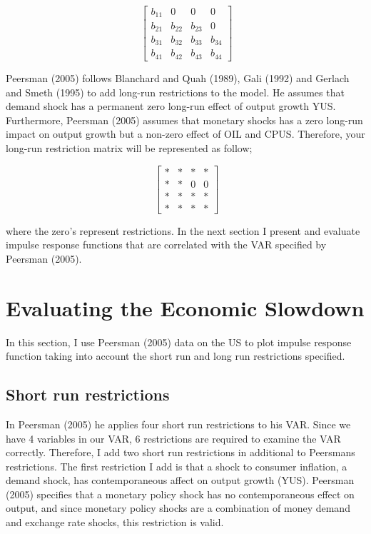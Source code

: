 \documentclass[11pt,preprint, authoryear]{elsarticle}
\numberwithin{equation}{section}
\numberwithin{figure}{section}
\numberwithin{table}{section}
\begin{document}
\[\ \begin{bmatrix} b_{11}& 0 & 0 & 0 \\
b_{21}& b_{22}& b_{23} & 0 \\
b_{31}& b_{32}& b_{33} & b_{34} \\
b_{41}& b_{42}& b_{43} & b_{44} \end{bmatrix} \]

Peersman (2005) follows Blanchard and Quah (1989), Gali (1992) and
Gerlach and Smeth (1995) to add long-run restrictions to the model. He
assumes that demand shock has a permanent zero long-run effect of output
growth YUS. Furthermore, Peersman (2005) assumes that monetary shocks
has a zero long-run impact on output growth but a non-zero effect of OIL
and CPUS. Therefore, your long-run restriction matrix will be
represented as follow;

\[\ \begin{bmatrix} *& *& *& * \\
*& *& 0 & 0 \\
*& *& *& * \\
*& *& * & * \end{bmatrix} \]

where the zero's represent restrictions. In the next section I present
and evaluate impulse response functions that are correlated with the VAR
specified by Peersman (2005).

\hypertarget{evaluating-the-economic-slowdown}{%
\section{Evaluating the Economic
Slowdown}\label{evaluating-the-economic-slowdown}}

In this section, I use Peersman (2005) data on the US to plot impulse
response function taking into account the short run and long run
restrictions specified.

\hypertarget{short-run-restrictions}{%
\subsection{Short run restrictions}\label{short-run-restrictions}}

In Peersman (2005) he applies four short run restrictions to his VAR.
Since we have 4 variables in our VAR, 6 restrictions are required to
examine the VAR correctly. Therefore, I add two short run restrictions
in additional to Peersmans restrictions. The first restriction I add is
that a shock to consumer inflation, a demand shock, has contemporaneous
affect on output growth (YUS). Peersman (2005) specifies that a monetary
policy shock has no contemporaneous effect on output, and since monetary
policy shocks are a combination of money demand and exchange rate
shocks, this restriction is valid.
\end{document}
